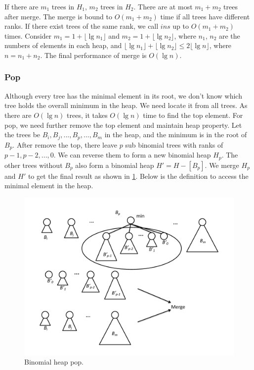 \documentclass[b5paper]{article}
\begin{document}
If there are $m_1$ trees in $H_1$, $m_2$ trees in $H_2$. There are at most $m_1 + m_2$ trees after merge. The merge is bound to $O(m_1 + m_2)$ time if all trees have different ranks. If there exist trees of the same rank, we call $ins$ up to $O(m_1 + m_2)$ times. Consider $m_1 = 1 + \lfloor \lg n_1 \rfloor$ and $m_2 = 1 + \lfloor \lg n_2 \rfloor$, where $n_1$, $n_2$ are the numbers of elements in each heap, and $\lfloor \lg n_1 \rfloor + \lfloor \lg n_2 \rfloor \leq 2 \lfloor \lg n \rfloor$, where $n = n_1 + n_2$. The final performance of merge is $O(\lg n)$.

\subsubsection{Pop}

Although every tree has the minimal element in its root, we don't know which tree holds the overall minimum in the heap. We need locate it from all trees. As there are $O(\lg n)$ trees, it takes $O(\lg n)$ time to find the top element. For pop, we need further remove the top element and maintain heap property. Let the trees be $B_i, B_j, ..., B_p, ..., B_m$ in the heap, and the minimum is in the root of $B_p$. After remove the top, there leave $p$ sub binomial trees with ranks of $p-1, p-2, ..., 0$. We can reverse them to form a new binomial heap $H_p$. The other trees without $B_p$ also form a binomial heap $H' = H - [B_p]$. We merge $H_p$ and $H'$ to get the final result as shown in \cref{fig:bheap-del-min}. Below is the definition to access the minimal element in the heap.

\begin{figure}[htbp]
  \centering
  \includegraphics[scale=0.4]{img/bheap-pop}
  \caption{Binomial heap pop.}
  \label{fig:bheap-del-min}
\end{figure}
\end{document}
